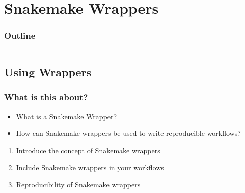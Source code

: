 \section{Snakemake Wrappers}

\begin{frame}
    \frametitle{Outline}
    \begin{columns}[t]
        \begin{column}{.5\textwidth}
            \tableofcontents[sections={1-7},currentsection]
        \end{column}
        \begin{column}{.5\textwidth}
            \tableofcontents[sections={8-15},currentsection]
        \end{column}
    \end{columns}
\end{frame}

\subsection{Using Wrappers}

\begin{frame}
    \frametitle{What is this about?}
    \begin{question}[Questions]
        \begin{itemize}
            \item What is a Snakemake Wrapper?
            \item How can Snakemake wrappers be used to write reproducible workflows?
        \end{itemize}
    \end{question}
    \begin{docs}[Objectives]
        \begin{enumerate}
            \item Introduce the concept of Snakemake wrappers
            \item Include Snakemake wrappers in your workflows
            \item Reproducibility of Snakemake wrappers
        \end{enumerate}
    \end{docs}
\end{frame}

